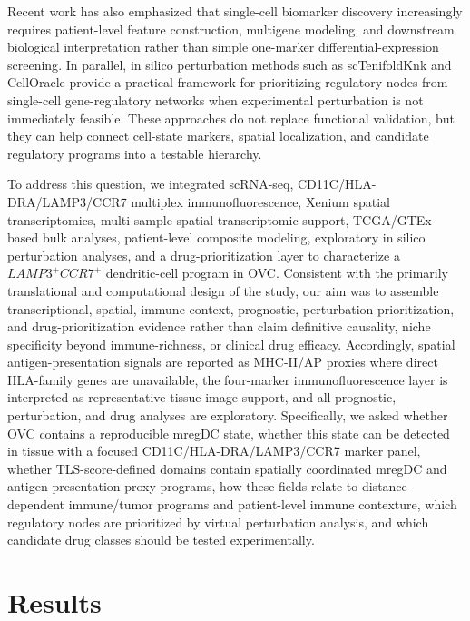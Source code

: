 \documentclass[pdflatex,sn-vancouver-num]{sn-jnl}
\begin{document}
Recent work has also emphasized that single-cell biomarker discovery increasingly requires patient-level feature construction, multigene modeling, and downstream biological interpretation rather than simple one-marker differential-expression screening\cite{bib112}. In parallel, in silico perturbation methods such as scTenifoldKnk and CellOracle provide a practical framework for prioritizing regulatory nodes from single-cell gene-regulatory networks when experimental perturbation is not immediately feasible\cite{bib113,bib114}. These approaches do not replace functional validation, but they can help connect cell-state markers, spatial localization, and candidate regulatory programs into a testable hierarchy.

To address this question, we integrated scRNA-seq, CD11C/HLA-DRA/LAMP3/CCR7 multiplex immunofluorescence, Xenium spatial transcriptomics, multi-sample spatial transcriptomic support, TCGA/GTEx-based bulk analyses, patient-level composite modeling, exploratory in silico perturbation analyses, and a drug-prioritization layer to characterize a $LAMP3^{+}CCR7^{+}$ dendritic-cell program in OVC. Consistent with the primarily translational and computational design of the study, our aim was to assemble transcriptional, spatial, immune-context, prognostic, perturbation-prioritization, and drug-prioritization evidence rather than claim definitive causality, niche specificity beyond immune-richness, or clinical drug efficacy. Accordingly, spatial antigen-presentation signals are reported as MHC-II/AP proxies where direct HLA-family genes are unavailable, the four-marker immunofluorescence layer is interpreted as representative tissue-image support, and all prognostic, perturbation, and drug analyses are exploratory. Specifically, we asked whether OVC contains a reproducible mregDC state, whether this state can be detected in tissue with a focused CD11C/HLA-DRA/LAMP3/CCR7 marker panel, whether TLS-score-defined domains contain spatially coordinated mregDC and antigen-presentation proxy programs, how these fields relate to distance-dependent immune/tumor programs and patient-level immune contexture, which regulatory nodes are prioritized by virtual perturbation analysis, and which candidate drug classes should be tested experimentally.



\section{Results}
\end{document}
